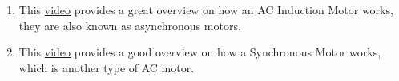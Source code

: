 \documentclass[paper=a4, fontsize=11pt]{article} %
\providecommand{\tightlist}{%
  \setlength{\itemsep}{0pt}\setlength{\parskip}{0pt}}
\numberwithin{equation}{section} %
\numberwithin{figure}{section} %
\numberwithin{table}{section} %
\begin{document}
\begin{enumerate}
\def\labelenumi{\arabic{enumi}.}
\tightlist
\item
  This \href{https://www.youtube.com/watch?v=AQqyGNOP_3o}{video}
  provides a great overview on how an AC Induction Motor works, they are
  also known as asynchronous motors.
\item
  This \href{https://www.youtube.com/watch?v=Vk2jDXxZIhs}{video}
  provides a good overview on how a Synchronous Motor works, which is
  another type of AC motor.
\end{enumerate}









\end{document}
